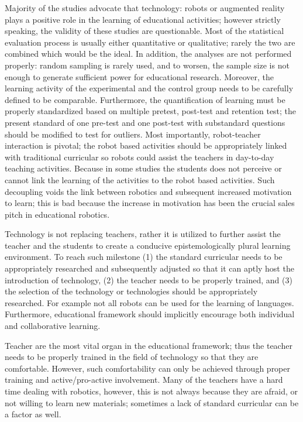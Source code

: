 \documentclass[conference]{IEEEtran}
\begin{document}
Majority of the studies advocate that technology: robots or augmented reality plays a positive role in the learning 
of educational activities; however strictly speaking, the validity of these studies are questionable. Most of the 
statistical evaluation process is usually either quantitative or qualitative; rarely the two are combined which would 
be the ideal. In addition, the analyses are not performed properly: random sampling is rarely used, and to worsen, the 
sample size is not enough to generate sufficient power for educational research. Moreover, the learning activity of the 
experimental and the control group needs to be carefully defined to be comparable. Furthermore, the quantification of 
learning must be properly standardized based on multiple pretest, post-test and retention test; the present standard of 
one pre-test and one post-test with substandard questions should be modified to test for outliers. Most importantly, 
robot-teacher interaction is pivotal; the robot based activities should be appropriately linked with traditional 
curricular so robots could assist the teachers in day-to-day teaching activities. Because in some studies the students 
does not perceive or cannot link the learning of the activities to the robot based activities. Such decoupling voids the 
link between robotics and subsequent increased motivation to learn; this is bad because the increase in motivation has 
been the crucial sales pitch in educational robotics.

Technology is not replacing teachers, rather it is utilized to further assist the teacher and the students to create a 
conducive epistemologically plural learning environment. To reach such milestone (1) the standard curricular needs to 
be appropriately researched and subsequently adjusted so that it can aptly host the introduction of technology, (2) the 
teacher needs to be properly trained, and (3) the selection of the technology or technologies should be appropriately 
researched. For example not all robots can be used for the learning of languages. Furthermore, educational framework 
should implicitly encourage both individual and collaborative learning. 

Teacher are the most vital organ in the educational framework; thus the teacher needs to be properly trained in the 
field of technology so that they are comfortable. However, such comfortability can only be achieved 
through proper training and active/pro-active involvement. Many of the teachers have a hard time dealing with robotics, 
however, this is not always because they are afraid, or not willing to learn new materials; sometimes a lack of standard 
curricular can be a factor as well. 
\end{document}

